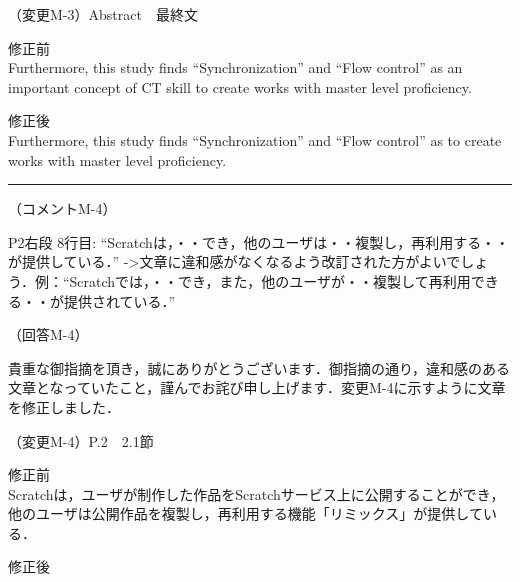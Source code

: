 \documentclass{jarticle} %
\def\subsection#1{ \vspace{1pc} {\gt #1} }
\def\nextans{ \vspace{2pc} \hrule }
\begin{document}
\subsection{（変更M-3）Abstract　最終文}
\vspace{-0.3cm}
\begin{description}
\item 修正前\\
\phantom{　}
Furthermore, this study finds ``Synchronization'' and ``Flow control'' as an important concept of CT skill to create works with master level proficiency.
\vspace{-0.3cm}
\item 修正後\\
\phantom{　}
Furthermore, this study finds ``Synchronization'' and ``Flow control'' as \textcolor{red}{} to create works with master level proficiency.
\end{description}


\nextans
\subsection{（コメントM-4）}

P2右段 8行目: ``Scratchは，・・でき，他のユーザは・・複製し，再利用する・・が提供している．'' -\textgreater  文章に違和感がなくなるよう改訂された方がよいでしょう．例：``Scratchでは，・・でき，また，他のユーザが・・複製して再利用できる・・が提供されている．''

\subsection{（回答M-4）}

貴重な御指摘を頂き，誠にありがとうございます．御指摘の通り，違和感のある文章となっていたこと，謹んでお詫び申し上げます．変更M-4に示すように文章を修正しました．

\subsection{（変更M-4）P.2　2.1節}
\vspace{-0.3cm}
\begin{description}
\item 修正前\\
\phantom{　}
Scratchは，ユーザが制作した作品をScratchサービス上に公開することができ，他のユーザは公開作品を複製し，再利用する機能「リミックス」が提供している．
\vspace{-0.3cm}
\item 修正後\\
\phantom{　}
\textcolor{red}{}
\end{description}
\end{document}
